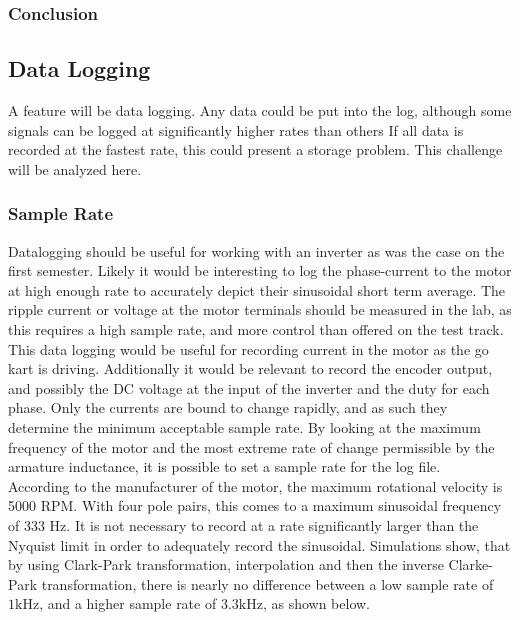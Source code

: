 \subsubsection*{Conclusion}
















\subsection{Data Logging}
A feature will be data logging. 
Any data could be put into the log, although some signals can be logged at significantly higher rates than others
If all data is recorded at the fastest rate, this could present a storage problem.
This challenge will be analyzed here.
\subsubsection{Sample Rate}

Datalogging should be useful for working with an inverter as was the case on the first semester.
Likely it would be interesting to log the phase-current to the motor at high enough rate to accurately depict their sinusoidal short term average.
The ripple current or voltage at the motor terminals should be measured in the lab, as this requires a high sample rate, and more control than offered on the test track.
This data logging would be useful for recording current in the motor as the go kart is driving.
Additionally it would be relevant to record the encoder output, and possibly the DC voltage at the input of the inverter and the duty for each phase.
Only the currents are bound to change rapidly, and as such they determine the minimum acceptable sample rate.
By looking at the maximum frequency of the motor and the most extreme rate of change permissible by the armature inductance, it is possible to set a sample rate for the log file.\\

According to the manufacturer of the motor, the maximum rotational velocity is 5000 RPM.
With four pole pairs, this comes to a maximum sinusoidal frequency of 333 Hz. 
It is not necessary to record at a rate significantly larger than the Nyquist limit in order to adequately record the sinusoidal.
Simulations show, that by using Clark-Park transformation, interpolation and then the inverse Clarke-Park transformation, there is nearly no difference between a low sample rate of $1\si{\kilo\hertz}$, and a higher sample rate of $3.3\si{\kilo\hertz}$, as shown below.

